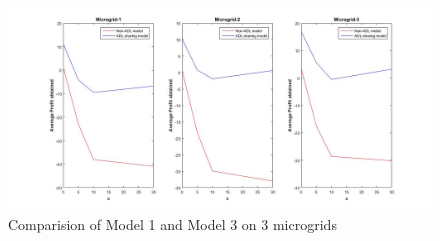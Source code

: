 \begin{figure}[thbp] \label{r1}
	\centering
	\includegraphics[scale = 0.2]{result_1.jpg}
	\caption{Comparision of Model 1 and Model 3  on 3 microgrids}
\end{figure}


